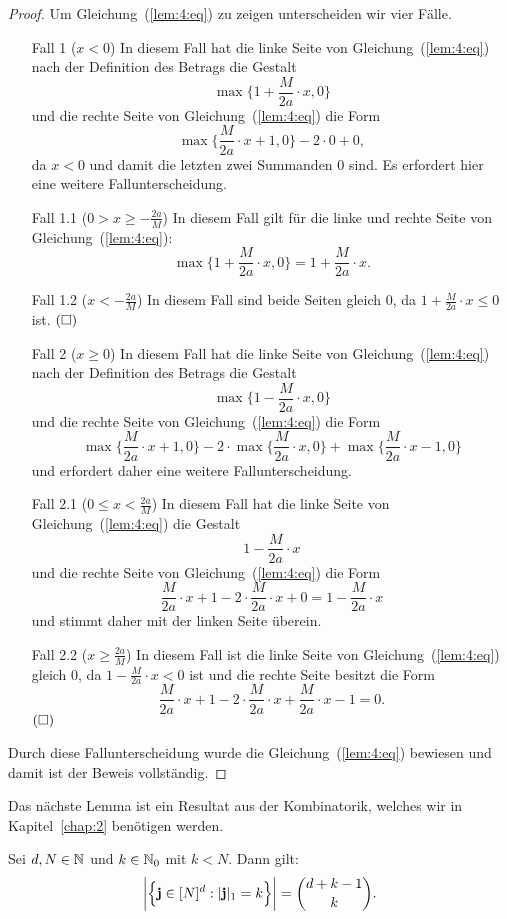 \begin{proof}
Um Gleichung~(\ref{lem:4:eq}) zu zeigen unterscheiden wir vier Fälle.
  \begin{itemize}
  \item[Fall 1] ($x < 0$) In diesem Fall hat die linke Seite von Gleichung~(\ref{lem:4:eq}) nach der Definition des Betrags die Gestalt $$\max\{1 + \frac{M}{2a} \cdot x, 0\}$$ und die rechte Seite von Gleichung~(\ref{lem:4:eq}) die Form $$\max\{\frac{M}{2a} \cdot x + 1, 0\} - 2 \cdot 0 + 0,$$ da $x < 0$ und damit die letzten zwei Summanden 0 sind. Es erfordert hier eine weitere Fallunterscheidung.
 \item[Fall 1.1] ($0 > x \geq -\frac{2a}{M}$) In diesem Fall gilt für die linke und rechte Seite von Gleichung~(\ref{lem:4:eq}):
 $$\max\{1 + \frac{M}{2a} \cdot x, 0\} = 1 + \frac{M}{2a} \cdot x.$$
 \item[Fall 1.2] ($x < -\frac{2a}{M}$) In diesem Fall sind beide Seiten gleich 0, da $1 + \frac{M}{2a} \cdot x \leq 0$ ist. $\hfill(\square)$
  \item[Fall 2] ($x \geq 0$) In diesem Fall hat die linke Seite von Gleichung~(\ref{lem:4:eq}) nach der Definition des Betrags die Gestalt $$\max\{1 - \frac{M}{2a} \cdot x, 0\}$$ und die rechte Seite von Gleichung~(\ref{lem:4:eq}) die Form $$\max\{\frac{M}{2a} \cdot x + 1, 0\} - 2 \cdot \max\{\frac{M}{2a} \cdot x, 0\} + \max\{\frac{M}{2a} \cdot x - 1, 0\}$$ und erfordert daher eine weitere Fallunterscheidung.
 \item[Fall 2.1] ($0 \leq x < \frac{2a}{M}$) In diesem Fall hat die linke Seite von Gleichung~(\ref{lem:4:eq}) die Gestalt $$1 - \frac{M}{2a} \cdot x$$ und die rechte Seite von Gleichung~(\ref{lem:4:eq}) die Form $$\frac{M}{2a} \cdot x + 1 - 2 \cdot \frac{M}{2a} \cdot x + 0 = 1 - \frac{M}{2a} \cdot x$$ und stimmt daher mit der linken Seite überein.
 \item[Fall 2.2] ($x \geq \frac{2a}{M}$) In diesem Fall ist die linke Seite von Gleichung~(\ref{lem:4:eq}) gleich 0, da $1 - \frac{M}{2a} \cdot x < 0$ ist und die rechte Seite besitzt die Form $$\frac{M}{2a} \cdot x + 1 - 2 \cdot \frac{M}{2a} \cdot x + \frac{M}{2a} \cdot x - 1 = 0. $$ $\hfill(\square)$
\end{itemize} 
Durch diese Fallunterscheidung wurde die Gleichung~(\ref{lem:4:eq}) bewiesen und damit ist der Beweis vollständig.
  \end{proof}
Das nächste Lemma ist ein Resultat aus der Kombinatorik, welches wir in Kapitel~\ref{chap:2} benötigen werden.
\begin{lem}
\label{lem:kombi}
Sei $d, N \in \mathbb{N}$ und $k \in \mathbb{N}_0$ mit $k < N$. Dann gilt:
$$\bigg|\Bigl\{\mathbf{j} \in [N]^d : |\mathbf{j}|_1 = k \Bigr\}\bigg| = \binom{d + k - 1}{k}.$$
\end{lem}
